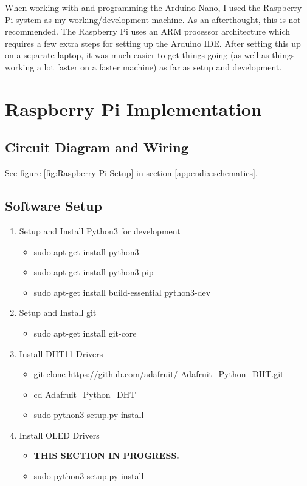 \documentclass{article}
\begin{document}
\begin{multicols}{2}
		When working with and programming the Arduino Nano, I used the Raspberry Pi system as my working/development machine. As an afterthought, this is not recommended. The Raspberry Pi uses an ARM processor architecture which requires a few extra steps for setting up the Arduino IDE. After setting this up on a separate laptop, it was much easier to get things going (as well as things working a lot faster on a faster machine) as far as setup and development.
		
		\section{Raspberry Pi Implementation}
		
		\subsection{Circuit Diagram and Wiring}
		See figure \ref{fig:Raspberry Pi Setup} in section \ref{appendix:schematics}.
		
		\subsection{Software Setup}
		
		\begin{enumerate}
			\item Setup and Install Python3 for development
			\begin{itemize}
				\item sudo apt-get install python3
				\item sudo apt-get install python3-pip
				\item sudo apt-get install build-essential python3-dev
			\end{itemize}
			\item Setup and Install git
			\begin{itemize}
				\item sudo apt-get install git-core
			\end{itemize}
			\item Install DHT11 Drivers
			\begin{itemize}
				\item git clone https://github.com/adafruit/ Adafruit\_Python\_DHT.git
				\item cd Adafruit\_Python\_DHT
				\item sudo python3 setup.py install
			\end{itemize}
			\item Install OLED Drivers
			\begin{itemize}
				\item \textbf{THIS SECTION IN PROGRESS.}
				\item sudo python3 setup.py install
			\end{itemize}
		\end{enumerate}
		

\end{multicols}
\end{document}

